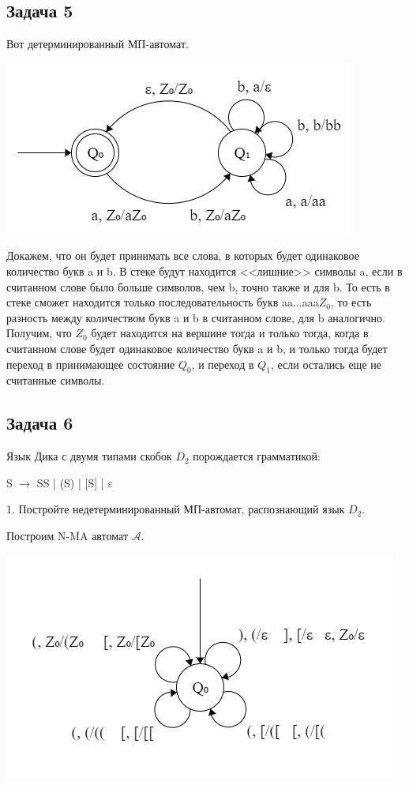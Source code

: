 \documentclass[a4paper,14pt]{article} %
\begin{document}
\subsection{Задача 5}
Вот детерминированный МП-автомат.
\begin{center}
    \includegraphics{04.png}
\end{center}
Докажем, что он будет принимать все слова, в которых будет одинаковое количество букв a и b.
В стеке будут находится <<лишние>> символы a, если в считанном слове было больше символов, чем b, точно также и для b. То есть в стеке сможет находится только последовательность букв aa...aaa$Z_0$, то есть разность между количеством букв a и b в считанном слове, для b аналогично.
Получим, что $Z_0$ будет находится на вершине тогда и только тогда, когда в считанном слове будет одинаковое количество букв a и b, и только тогда будет переход в принимающее состояние $Q_0$, и переход в $Q_1$, если остались еще не считанные символы.


\subsection{Задача 6}
Язык Дика с двумя типами скобок $D_2$ порождается грамматикой:

S $\longrightarrow$ SS | (S) | [S] | $\varepsilon$ 

1. Постройте недетерминированный МП-автомат, распознающий язык $D_2$.

Построим N-MA автомат $\mathcal{A}$.
\begin{center}
\includegraphics[scale=1]{01.png}
\end{center}
\end{document}
